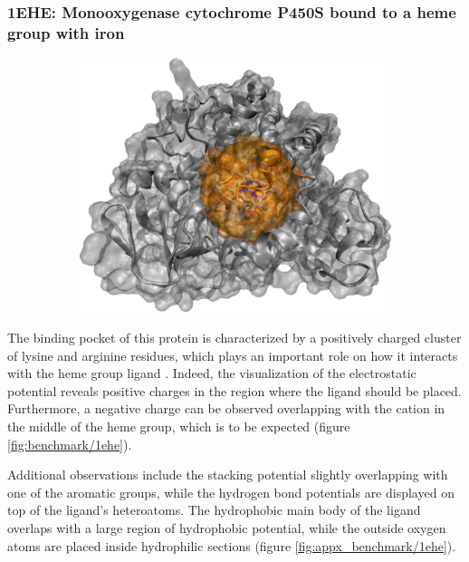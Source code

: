     \subsubsection{1EHE: Monooxygenase cytochrome P450S bound to a heme group with iron}
      \begin{figure}[H] \centering
        \begin{subfigure}[c]{0.3\textwidth} \centering
          \includegraphics[width=1\textwidth]{figures/results/ps_prot/1ehe.png}
        \end{subfigure}
        \begin{subfigure}[c]{0.3\textwidth} \centering
        \end{subfigure}
      \end{figure}

      The binding pocket of this protein is characterized by a positively charged cluster of lysine and arginine residues, which plays an important role on how it interacts with the heme group ligand \cite{benchmark_positive_2001}. Indeed, the visualization of the electrostatic potential reveals positive charges in the region where the ligand should be placed. Furthermore, a negative charge can be observed overlapping with the cation in the middle of the heme group, which is to be expected (figure \ref{fig:benchmark/1ehe}).

      Additional observations include the stacking potential slightly overlapping with one of the aromatic groups, while the hydrogen bond potentials are displayed on top of the ligand's heteroatoms. The hydrophobic main body of the ligand overlaps with a large region of hydrophobic potential, while the outside oxygen atoms are placed inside hydrophilic sections (figure \ref{fig:appx_benchmark/1ehe}).

